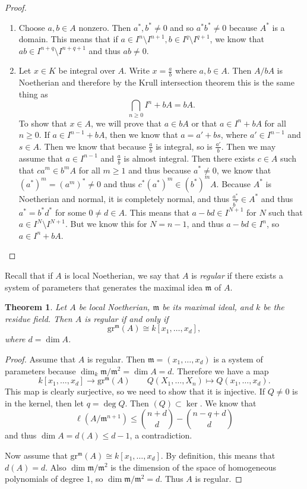 \documentclass[leqno, openany]{memoir}
\newtheorem{thm}{Theorem}[section]
\theoremstyle{definition}
\theoremstyle{remark}
\theoremstyle{plain}
\theoremstyle{definition}
\theoremstyle{remark}
\newcommand{\mf}[1]{\mathfrak{#1}}
\newcommand{\mr}[1]{\mathrm{#1}}
\begin{document}
\begin{proof} \begin{enumerate} \item Choose $a,b \in A$ nonzero. Then $a^*,
    b^* \neq 0$ and so $a^* b^* \neq 0$ because $A^*$ is a domain. This means
    that if $a \in I^n \setminus I^{n+1}, b \in I^q \setminus I^{q+1}$, we know
    that $ab \in I^{n+q} \setminus I^{n+q+1}$ and thus $ab \neq 0$.  \item Let
    $x \in K$ be integral over $A$. Write $x = \frac{a}{b}$ where $a,b \in A$.
    Then $A/bA$ is Noetherian and therefore by the Krull intersection theorem
    this is the same thing as \[ \bigcap_{n \geq 0} I^n + bA = bA. \] To show
    that $x \in A$, we will prove that $a \in bA$ or that $a \in I^n + bA$ for
    all $n \geq 0$. If $a \in I^{n-1} + bA$, then we know that $a = a' + bs$,
    where $a' \in I^{n-1}$ and $s \in A$. Then we know that because
    $\frac{a}{b}$ is integral, so is $\frac{a'}{b}$. Then we may assume that $a
    \in I^{n-1}$ and $\frac{a}{b}$ is almost integral. Then there exists $c \in
    A$ such that $ca^m \in b^m A$ for all $m \geq 1$ and thus because $a^* \neq
    0$, we know that $(a^*)^m = (a^m)^* \neq 0$ and thus $c^* (a^*)^m \in
    (b^*)^m A$. Because $A^*$ is Noetherian and normal, it is completely
    normal, and thus $\frac{a^*}{b^*} \in A^*$ and thus $a^* = b^* d^*$ for
    some $0 \neq d \in A$. This means that $a-bd \in I^{N+1}$ for $N$ such that
    $a \in I^N \setminus I^{N+1}$. But we know this for $N = n-1$, and thus
    $a-bd \in I^n$, so $a \in I^n + bA$. \qedhere \end{enumerate} \end{proof}

Recall that if $A$ is local Noetherian, we say that $A$ is \textit{regular} if
there exists a system of parameters that generates the maximal idea $\mf{m}$ of
$A$.

\begin{thm} Let $A$ be local Noetherian, $\mf{m}$ be its maximal ideal, and $k$
    be the residue field. Then $A$ is regular if and only if \[
    \mr{gr}^{\mf{m}}(A) \cong k[x_1, \ldots, x_d], \] where $d = \dim A$.
\end{thm}

\begin{proof} Assume that $A$ is regular. Then $\mf{m} = (x_1, \ldots, x_d)$ is
    a system of parameters because $\dim_k \mf{m} / \mf{m}^2 = \dim A = d$.
    Therefore we have a map \[ k[x_1, \ldots, x_d] \longrightarrow
    \mr{gr}^{\mf{m}}(A) \qquad Q(X_1, \ldots, X_n) \mapsto Q(x_1, \ldots, x_d).
\] This map is clearly surjective, so we need to show that it is injective. If
$Q \neq 0$ is in the kernel, then let $q = \deg Q$. Then $(Q) \subset \ker$. We
know that \[ \ell(A / \mf{m}^{n+1}) \leq \binom{n+d}{d} - \binom{n-q+d}{d} \]
and thus $\dim A = d(A) \leq d-1$, a contradiction.

    Now assume that $\mr{gr}^{\mf{m}}(A) \cong k[x_1, \ldots, x_d]$. By
definition, this means that $d(A) = d$. Also $\dim \mf{m} / \mf{m}^2$ is the
dimension of the space of homogeneous polynomials of degree $1$, so $\dim
\mf{m} / \mf{m}^2 = d$. Thus $A$ is regular.  \end{proof}
\end{document}
